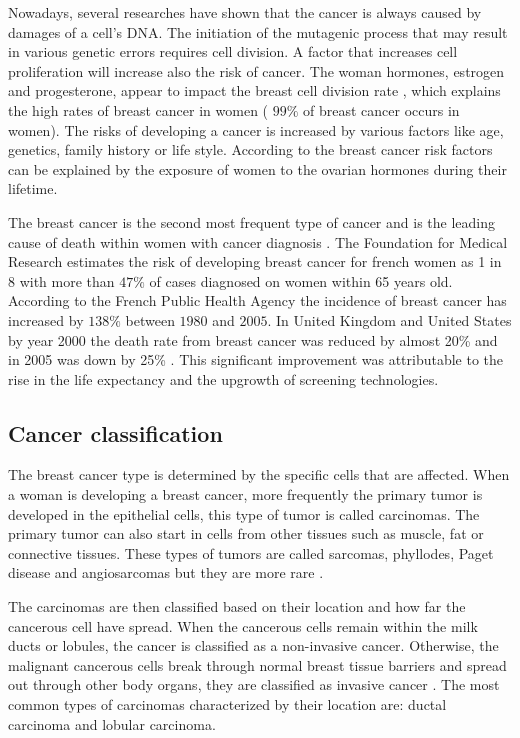 Nowadays, several researches \citep{pike_estrogens_1993,martin_webmd_2017} have shown that the cancer is always caused by damages of a cell's DNA. The initiation of the mutagenic process that may result in various genetic errors requires cell division.  A factor that increases cell proliferation will increase also the risk of cancer. The woman hormones, estrogen and progesterone, appear to impact the breast cell division rate \citep{ciocca_estrogen_1997,fanelli_estrogen_1996},  which explains the high rates of breast cancer in women ( $99\%$ of breast cancer occurs in women). The risks of developing a cancer is increased by various factors like age, genetics, family history or life style. According to \citep{martin_webmd_2017} the breast cancer risk factors can be explained by the exposure of women to the ovarian hormones during their lifetime.

The breast cancer is the second most frequent type of cancer and is the leading cause of death within women with cancer diagnosis \citep{spf_chiffres_2017}.  The Foundation for Medical Research \citep{frm_chiffres_2017} estimates the risk of developing breast cancer for french women as 1 in 8 with more than $47\%$ of cases diagnosed on women within 65 years old.
According to the French Public Health Agency \citep{spf_chiffres_2017} the incidence of breast cancer has increased by $138\% $ between $1980$ and $2005$. In United Kingdom and United States by year 2000 the death rate from breast cancer was reduced by almost 20\% and in 2005 was down by 25\% \citep{peto_uk_2000}. This significant improvement was attributable to the rise in the life expectancy and the upgrowth of screening technologies.


\subsection{Cancer classification }\label{subsection:breastcancerclasification}
The breast cancer type is determined by the specific cells that are affected. 
When a woman is developing a breast cancer, more frequently the primary tumor is developed in the epithelial cells, this type of tumor is called carcinomas. The primary tumor can also start in cells from other tissues such as muscle, fat or connective tissues. These types of tumors are called sarcomas, phyllodes, Paget disease and angiosarcomas but they are more rare \citep{acs_cancer_2017}. 

The carcinomas are then classified based on their location and how far the cancerous cell have spread. When the cancerous cells remain within the milk ducts or lobules, the cancer is classified as a non-invasive cancer. Otherwise, the malignant cancerous cells break through normal breast tissue barriers and spread out through other body organs, they are classified as invasive cancer \citep{andolina2011mammographic}. The most common types of carcinomas characterized by their location are: ductal carcinoma and lobular carcinoma. 

